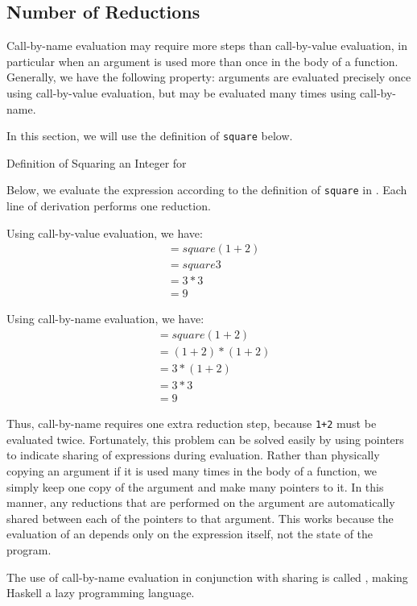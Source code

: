 \subsection{Number of Reductions}\label{subsec:Number_of_Reductions}
Call-by-name evaluation may require more steps than call-by-value evaluation, in particular when an argument is used more than once in the body of a function.
Generally, we have the following property: arguments are evaluated precisely once using call-by-value evaluation, but may be evaluated many times using call-by-name.

In this section, we will use the definition of \texttt{square} below.
\begin{listing}[h!tbp]
\caption{Definition of Squaring an Integer for }
\label{lst:Square_Definition}
\end{listing}

Below, we evaluate the expression  according to the definition of \texttt{square} in .
Each line of derivation performs one reduction.

Using call-by-value evaluation, we have:
\begin{align*}
  &= square (1+2) \\
  &= square 3 \\
  &= 3 * 3 \\
  &= 9
\end{align*}

Using call-by-name evaluation, we have:
\begin{align*}
  &= square (1+2) \\
  &= (1+2) * (1+2) \\
  &= 3 * (1+2) \\
  &= 3 * 3 \\
  &= 9
\end{align*}

Thus, call-by-name requires one extra reduction step, because \texttt{1+2} must be evaluated twice.
Fortunately, this problem can be solved easily by using pointers to indicate sharing of expressions during evaluation.
Rather than physically copying an argument if it is used many times in the body of a function, we simply keep one copy of the argument and make many pointers to it.
In this manner, any reductions that are performed on the argument are automatically shared between each of the pointers to that argument.
This works because the evaluation of an  depends only on the expression itself, not the state of the program.

The use of call-by-name evaluation in conjunction with sharing is called , making Haskell a lazy programming language.

